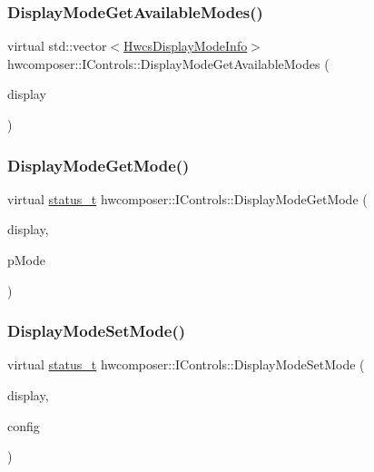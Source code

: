 \subsubsection{\texorpdfstring{Display\+Mode\+Get\+Available\+Modes()}{DisplayModeGetAvailableModes()}}
{\footnotesize\ttfamily virtual std\+::vector$<$\mbox{\hyperlink{hwcserviceapi_8h_a6e13f5285374b86aab82ec0c0ba62d7a}{Hwcs\+Display\+Mode\+Info}}$>$ hwcomposer\+::\+I\+Controls\+::\+Display\+Mode\+Get\+Available\+Modes (\begin{DoxyParamCaption}\item[{uint32\+\_\+t}]{display }\end{DoxyParamCaption})\hspace{0.3cm}{\ttfamily [pure virtual]}}

\mbox{\label{classhwcomposer_1_1IControls_aa26011465d8f977f12a4ba19a646f917}} 
\subsubsection{\texorpdfstring{Display\+Mode\+Get\+Mode()}{DisplayModeGetMode()}}
{\footnotesize\ttfamily virtual \mbox{\hyperlink{hwcserviceapi_8h_a3806fb2027d9a316d8ca8d9b8b8eb96f}{status\+\_\+t}} hwcomposer\+::\+I\+Controls\+::\+Display\+Mode\+Get\+Mode (\begin{DoxyParamCaption}\item[{uint32\+\_\+t}]{display,  }\item[{\mbox{\hyperlink{hwcserviceapi_8h_a6e13f5285374b86aab82ec0c0ba62d7a}{Hwcs\+Display\+Mode\+Info}} $\ast$}]{p\+Mode }\end{DoxyParamCaption})\hspace{0.3cm}{\ttfamily [pure virtual]}}

\mbox{\label{classhwcomposer_1_1IControls_a276c0ad9ee6973cab285da547f929e3f}} 
\subsubsection{\texorpdfstring{Display\+Mode\+Set\+Mode()}{DisplayModeSetMode()}}
{\footnotesize\ttfamily virtual \mbox{\hyperlink{hwcserviceapi_8h_a3806fb2027d9a316d8ca8d9b8b8eb96f}{status\+\_\+t}} hwcomposer\+::\+I\+Controls\+::\+Display\+Mode\+Set\+Mode (\begin{DoxyParamCaption}\item[{uint32\+\_\+t}]{display,  }\item[{const uint32\+\_\+t}]{config }\end{DoxyParamCaption})\hspace{0.3cm}{\ttfamily [pure virtual]}}


